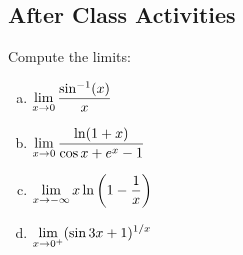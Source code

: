\documentclass[notes]{subfiles}
\begin{document}
	\subsection*{After Class Activities}
		\begin{ex}
			Compute the limits:
			\begin{enumerate}[(a)]
				\item $\displaystyle \lim_{x\to 0} \dfrac{\sin^{-1}(x)}{x}$
					
				\item $\displaystyle \lim_{x\to 0} \dfrac{\ln (1+x)}{\cos x + e^x - 1}$	
					
				\item $\displaystyle \lim_{x\to -\infty} x\ln\left( 1 - \dfrac{1}{x}\right)$
					
				\item $\displaystyle \lim_{x\to 0^+} (\sin 3x + 1)^{1/x}$
			\end{enumerate}
		\end{ex}
	
\clearpage
\end{document}
